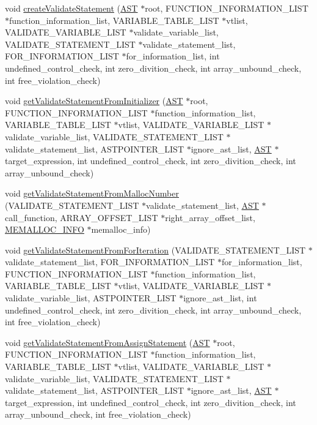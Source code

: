 \begin{DoxyCompactItemize}
\item 
void \hyperlink{Varidate__statement_8h_a151271f7803498af7e5096f1e4d8c186}{createValidateStatement} (\hyperlink{structabstract__syntax__tree}{AST} $\ast$root, FUNCTION\_\-INFORMATION\_\-LIST $\ast$function\_\-information\_\-list, VARIABLE\_\-TABLE\_\-LIST $\ast$vtlist, VALIDATE\_\-VARIABLE\_\-LIST $\ast$validate\_\-variable\_\-list, VALIDATE\_\-STATEMENT\_\-LIST $\ast$validate\_\-statement\_\-list, FOR\_\-INFORMATION\_\-LIST $\ast$for\_\-information\_\-list, int undefined\_\-control\_\-check, int zero\_\-divition\_\-check, int array\_\-unbound\_\-check, int free\_\-violation\_\-check)
\item 
void \hyperlink{Varidate__statement_8h_a0b17a43ec9679b3b3058933552bfa734}{getValidateStatementFromInitializer} (\hyperlink{structabstract__syntax__tree}{AST} $\ast$root, FUNCTION\_\-INFORMATION\_\-LIST $\ast$function\_\-information\_\-list, VARIABLE\_\-TABLE\_\-LIST $\ast$vtlist, VALIDATE\_\-VARIABLE\_\-LIST $\ast$validate\_\-variable\_\-list, VALIDATE\_\-STATEMENT\_\-LIST $\ast$validate\_\-statement\_\-list, ASTPOINTER\_\-LIST $\ast$ignore\_\-ast\_\-list, \hyperlink{structabstract__syntax__tree}{AST} $\ast$target\_\-expression, int undefined\_\-control\_\-check, int zero\_\-divition\_\-check, int array\_\-unbound\_\-check)
\item 
void \hyperlink{Varidate__statement_8h_a90132c1a1e583affd0a5d9f1ba4efe1d}{getValidateStatementFromMallocNumber} (VALIDATE\_\-STATEMENT\_\-LIST $\ast$validate\_\-statement\_\-list, \hyperlink{structabstract__syntax__tree}{AST} $\ast$call\_\-function, ARRAY\_\-OFFSET\_\-LIST $\ast$right\_\-array\_\-offset\_\-list, \hyperlink{structmemory__allocation__info}{MEMALLOC\_\-INFO} $\ast$memalloc\_\-info)
\item 
void \hyperlink{Varidate__statement_8h_ab5434dbc6f98a0b8098d48fbcc6951e8}{getValidateStatementFromForIteration} (VALIDATE\_\-STATEMENT\_\-LIST $\ast$validate\_\-statement\_\-list, FOR\_\-INFORMATION\_\-LIST $\ast$for\_\-information\_\-list, FUNCTION\_\-INFORMATION\_\-LIST $\ast$function\_\-information\_\-list, VARIABLE\_\-TABLE\_\-LIST $\ast$vtlist, VALIDATE\_\-VARIABLE\_\-LIST $\ast$validate\_\-variable\_\-list, ASTPOINTER\_\-LIST $\ast$ignore\_\-ast\_\-list, int undefined\_\-control\_\-check, int zero\_\-divition\_\-check, int array\_\-unbound\_\-check, int free\_\-violation\_\-check)
\item 
void \hyperlink{Varidate__statement_8h_af9bd0329c9e3cb3c46e8b6be300d1182}{getValidateStatementFromAssignStatement} (\hyperlink{structabstract__syntax__tree}{AST} $\ast$root, FUNCTION\_\-INFORMATION\_\-LIST $\ast$function\_\-information\_\-list, VARIABLE\_\-TABLE\_\-LIST $\ast$vtlist, VALIDATE\_\-VARIABLE\_\-LIST $\ast$validate\_\-variable\_\-list, VALIDATE\_\-STATEMENT\_\-LIST $\ast$validate\_\-statement\_\-list, ASTPOINTER\_\-LIST $\ast$ignore\_\-ast\_\-list, \hyperlink{structabstract__syntax__tree}{AST} $\ast$target\_\-expression, int undefined\_\-control\_\-check, int zero\_\-divition\_\-check, int array\_\-unbound\_\-check, int free\_\-violation\_\-check)

\end{DoxyCompactItemize}
